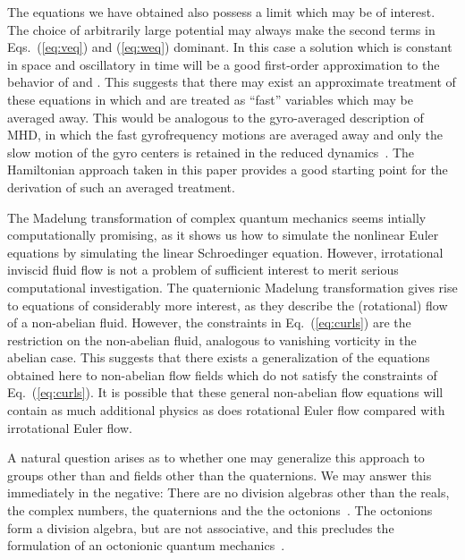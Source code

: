 \documentclass[a4paper,aps,prd,preprint,groupedaddress]{revtex4}
\providecommand{\bfv}{{\bf v}}
\providecommand{\bfw}{{\bf w}}
\begin{document}
The equations we have obtained also possess a limit which may be of interest. The choice of arbitrarily large potential may always make the second terms in Eqs.~(\ref{eq:veq}) and (\ref{eq:weq}) dominant. In this case a solution which is constant in space and oscillatory in time will be a good first-order approximation to the behavior of \myHighlight{$\bfv$}\coordHE{} and \myHighlight{$\bfw$}\coordHE{}. This suggests that there may exist an approximate treatment of these equations in which \myHighlight{$\bfv$}\coordHE{} and \myHighlight{$\bfw$}\coordHE{} are treated as ``fast'' variables which may be averaged away. This would be analogous to the gyro-averaged description of MHD, in which the fast gyrofrequency motions are averaged away and only the slow motion of the gyro centers is retained in the reduced dynamics~\cite{bib:gyroav1,bib:gyroav2,bib:gyroav3}. The Hamiltonian approach taken in this paper provides a good starting point for the derivation of such an averaged treatment.

The Madelung transformation of complex quantum mechanics seems intially computationally promising, as it shows us how to simulate the nonlinear Euler equations by simulating the linear Schroedinger equation. However, irrotational inviscid fluid flow is not a problem of sufficient interest to merit serious computational investigation. The quaternionic Madelung transformation gives rise to equations of considerably more interest, as they describe the (rotational) flow of a non-abelian fluid.  However, the constraints in Eq.~(\ref{eq:curls}) are the restriction on the non-abelian fluid, analogous to vanishing vorticity in the abelian case. This suggests that there exists a generalization of the equations obtained here to non-abelian flow fields which do not satisfy the constraints of Eq.~(\ref{eq:curls}). It is possible that these general non-abelian flow equations will contain as much additional physics as does rotational Euler flow compared with irrotational Euler flow. 

A natural question arises as to whether one may generalize this approach to groups other than \coordHE{} and fields other than the quaternions. We may answer this immediately in the negative: There are no division algebras other than the reals, the complex numbers, the quaternions and the the octonions~\cite{bib:quatbook}. The octonions form a division algebra, but are not associative, and this precludes the formulation of an octonionic quantum mechanics~\cite{bib:adlerbook}.
\end{document}

